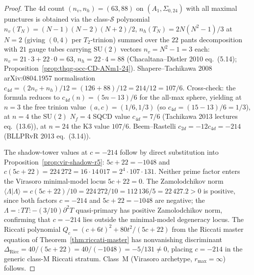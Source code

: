 \begin{proof}
The 4d count $(n_v, n_h) = (63, 88)$ on $(A_1, \Sigma_{0,24})$ with
all maximal punctures is obtained via the class-$\mathcal S$
polynomial $n_v(T_N) = (N-1)(N-2)(N+2)/2$, $n_h(T_N) = 2N(N^2-1)/3$
at $N = 2$ (giving $(0, 4)$ per $T_2$-trinion) summed over the
$22$ pants decomposition with $21$ gauge tubes carrying
$\mathrm{SU}(2)$ vectors $n_v = N^2-1 = 3$ each: $n_v = 21\cdot 3
+ 22\cdot 0 = 63$, $n_h = 22\cdot 4 = 88$
(Chacaltana--Distler 2010 eq.~(5.14);
Proposition~\ref{prop:thqg-occ-CD-ANm1-24}). Shapere--Tachikawa 2008 arXiv:0804.1957
normalisation
$c_{4d} = (2n_v + n_h)/12 = (126 + 88)/12 = 214/12 = 107/6$.
Cross-check: the formula reduces to $c_{4d}(n) = (5n - 13)/6$
for the all-max sphere, yielding at $n = 3$ the free trinion
value $(a, c) = (1/6, 1/3)$ (so $c_{4d} = (15-13)/6 = 1/3$),
at $n = 4$ the $\mathrm{SU}(2)$ $N_f = 4$ SQCD value
$c_{4d} = 7/6$ (Tachikawa 2013 lectures eq.~(13.6)), at
$n = 24$ the K3 value $107/6$. Beem--Rastelli
$c_{2d} = -12 c_{4d} = -214$ (BLLPRvR 2013 eq.~(3.14)).

The shadow-tower values at $c = -214$ follow by direct substitution
into Proposition~\ref{prop:vir-shadow-r5}:
$5c + 22 = -1048$ and
$c(5c+22) = 224\,272 = 16\cdot 14\,017
=2^4\cdot107\cdot131$. Neither prime factor enters the Virasoro
minimal-model locus $5c+22 = 0$. The Zamolodchikov norm
$\langle\Lambda|\Lambda\rangle = c(5c+22)/10 = 224\,272/10
= 112\,136/5 = 22\,427.2 > 0$ is positive, since both factors
$c = -214$ and $5c+22 = -1048$ are negative; the
$\Lambda = {:}TT{:} - (3/10)\partial^2 T$ quasi-primary has
positive Zamolodchikov norm, confirming that $c = -214$ lies
outside the minimal-model degeneracy locus. The Riccati
polynomial $Q_c = (c + 6t)^2 + 80t^2/(5c+22)$ from the Riccati
master equation of Theorem~\ref{thm:riccati-master} has nonvanishing discriminant
$\Delta_{\mathrm{Ricc}} = 40/(5c+22) = 40/(-1048) = -5/131
\neq 0$, placing $c=-214$ in the generic class-$\mathrm M$
Riccati stratum. Class~$\mathrm M$ (Virasoro archetype,
$r_{\max} = \infty$) follows.
\end{proof}

